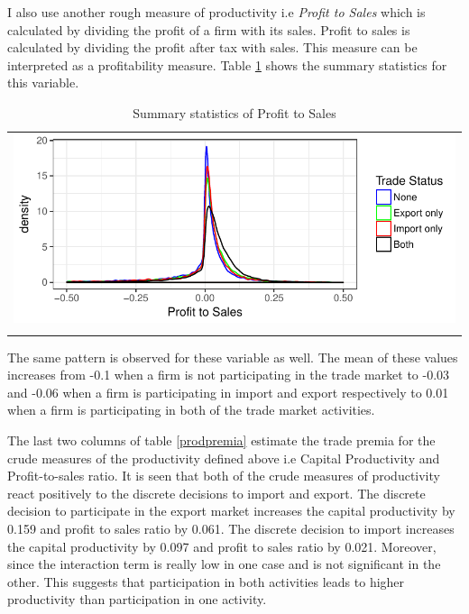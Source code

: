 \documentclass[11pt]{article}
\begin{document}
I also use another rough measure of productivity i.e
\textit{Profit to Sales} which is calculated by dividing the profit of
a firm with its sales. Profit to sales is calculated by dividing
the profit after tax with sales. This measure can be interpreted as a
profitability measure. Table \ref{tab:pts} shows the summary
statistics for this variable. 
\begin{center}
\begin{table}[H]
\caption{Summary statistics of Profit to Sales}
\label{tab:pts}
\begin{tabular}{c}
 \includegraphics{./PICS/denspatsales.pdf}   \\ 
   \\  
\end{tabular}
\end{table}
\end{center}
The same pattern is observed for these variable as well. The mean of
these values increases from -0.1 when a firm is not participating in
the trade market to -0.03 and  -0.06 when a firm is participating in
import and export respectively to 0.01 when a firm is participating in
both of the trade market activities.  

The last two columns of table \ref{prodpremia} estimate the trade
premia for the crude measures of the productivity defined above i.e
Capital Productivity and Profit-to-sales ratio. It is seen that both
of the crude measures of productivity react positively to the discrete
decisions to import and export. The discrete decision to participate
in the export market increases the capital productivity by 0.159 and
profit to sales ratio by 0.061. The discrete decision to import
increases the  capital productivity by 0.097 and
profit to sales ratio by 0.021. 
Moreover, since the interaction term is really low in one case and 
is not significant in the other.  This suggests that participation in both activities
leads to higher productivity than participation in one activity. 
\end{document}
